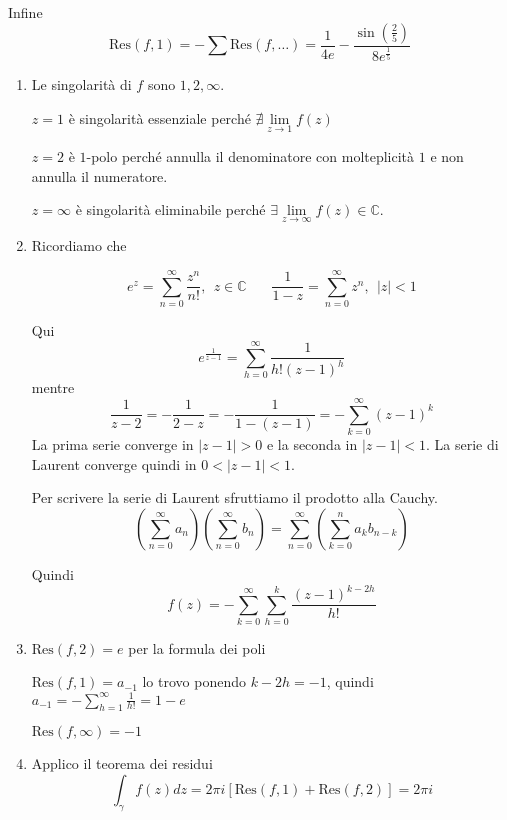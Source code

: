 Infine
\begin{equation*}
\mathrm{Res}\left( f,1\right) =-\sum \mathrm{Res}\left( f,\dotsc \right) =\frac{1}{4e} -\frac{\sin\left(\frac{2}{5}\right)}{8e^{\frac{1}{5}}}
\end{equation*}
\Soluzione
\begin{enumerate}
\item Le singolarità di $f$ sono $1,2,\infty $.

$z=1$ è singolarità essenziale perché $\nexists \lim\limits _{z\rightarrow 1} f\left( z\right)$

$z=2$ è $1$-polo perché annulla il denominatore con molteplicità $1$ e non annulla il numeratore.

$z=\infty $ è singolarità eliminabile perché $\exists \lim\limits _{z\rightarrow \infty } f\left( z\right) \in \mathbb{C}$.
\item Ricordiamo che

\begin{rem}
\begin{equation*}
e^{z} =\sum\limits ^{\infty }_{n=0}\frac{z^{n}}{n!} ,\ \ z\in \mathbb{C} \ \ \ \ \ \ \ \ \frac{1}{1-z} =\sum\limits ^{\infty }_{n=0} z^{n} ,\ \ \left| z\right| < 1
\end{equation*}
\end{rem}

Qui\begin{equation*}
e^{\frac{1}{z-1}} =\sum\limits ^{\infty }_{h=0}\frac{1}{h!\left( z-1\right)^{h}}
\end{equation*}mentre\begin{equation*}
\frac{1}{z-2} =-\frac{1}{2-z} =-\frac{1}{1-\left( z-1\right)} =-\sum\limits ^{\infty }_{k=0}\left( z-1\right)^{k}
\end{equation*}La prima serie converge in $\left| z-1\right|  >0$ e la seconda in $\left| z-1\right| < 1$. La serie di Laurent converge quindi in $0< \left| z-1\right| < 1$.\begin{rem}
Per scrivere la serie di Laurent sfruttiamo il prodotto alla Cauchy.
\begin{equation*}
\left(\sum\limits ^{\infty }_{n=0} a_{n}\right)\left(\sum\limits ^{\infty }_{n=0} b_{n}\right) =\sum\limits ^{\infty }_{n=0}\left(\sum\limits ^{n}_{k=0} a_{k} b_{n-k}\right)
\end{equation*}
\end{rem}Quindi\begin{equation*}
f\left( z\right) =-\sum\limits ^{\infty }_{k=0}\sum\limits ^{k}_{h=0}\frac{\left( z-1\right)^{k-2h}}{h!}
\end{equation*}
\item $\mathrm{Res}\left( f,2\right) =e$ per la formula dei poli

$\mathrm{Res}\left( f,1\right) =a_{-1}$ lo trovo ponendo $k-2h=-1$, quindi $a_{-1} =-\sum\limits ^{\infty }_{h=1}\frac{1}{h!} =1-e$

$\mathrm{Res}\left( f,\infty \right) =-1$
\item Applico il teorema dei residui\begin{equation*}
\int\nolimits _{\gamma } f\left( z\right) dz=2\pi i\left[\mathrm{Res}\left( f,1\right) +\mathrm{Res}\left( f,2\right)\right] =2\pi i
\end{equation*}
\end{enumerate}

